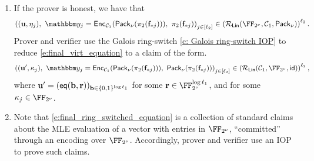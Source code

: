 \documentclass[11pt,letterpaper,usenames,dvipsnames]{article}
\begin{document}
\begin{construction}
\begin{enumerate}[leftmargin=*]
Note that \eqref{e:virtual_IOPP_intermediate} holds if and only if, for all $j\in [\codedim_2]$,
%
\begin{align*}
\eta_j &=\sum_{i\in [\codedim_1']} \vv_i \cdot \pi_2(\bfh_{ij}) = \sum_{i\in [\codedim_1']} \vv_i \cdot \sum_{t\in [\codedim_1]} M_{0it}\cdot \pi_2(\bff_{tj})\\ =& \sum_{t\in [\codedim_1]} \left(\sum_{i\in[\codedim_1']}M_{0it}\cdot \vv_i\right)\cdot \pi_2(\bff_{tj}) = \langle \uu_j , \pi_2(\bff_{*j})\rangle,
\end{align*}
where $\uu \in \comfield^{\codedim_1}$ is the vector whose $t$-th entry is
%
$$
\uu_t = \langle \vv, M_{0*t}\rangle \in \comfield,
$$
and  $M_{0*t}\in \comfield^{\codedim_1'}$ denotes the $t$-th column of $M_0$, for $t\in [\codedim_1]$,
%

%
Note that, if $\Pi_{\mathsf{red}}$ is as in \cref{?}, then $\vv= (\mathsf{eq}(\bb,\rr))_{\bb\in \{0,1\}^{\log \codedim_1'}}$ for some $\rr\in \comfield^{\log \codedim_1'}$, and then 
$
\uu_t = \mle{M_{0*t}}(\rr) \in \comfield. 
$
%

\item If the prover is honest, we have that
%
\begin{equation}\label{e:final_virt_equation}
\left((\uu, \eta_j),\ \oracle_j = \Enc_{\cC_1}(\pack(\pi_2(\bff_{*j}))), \ \pi_2(\bff_{*j})\right)_{j\in [\codedim_2]} \in \left(\LIN( \comfield,\cC_1,\pack)\right)^{\codedim_2}.
\end{equation}
%
Prover and verifier use the Galois ring-switch \cref{c: Galois ring-switch IOP} to reduce  \eqref{e:final_virt_equation} to a claim of the form.
\begin{equation}\label{e:final_ring_switched_equation}
\left((\uu', \kappa_j),\ \oracle_j = \Enc_{\cC_1}(\pack(\pi_2(\bff_{*j}))), \ \pack(\pi_2(\bff_{*j}))\right)_{j\in [\codedim_2]} \in \left(\LIN(\cC_1, \comfield,\mathsf{id})\right)^{\codedim_2},
\end{equation}
where $\mathbf{u}'=(\mathsf{eq}(\mathbf{b},\mathbf{r}))_{\mathbf{b}\in \{0,1\}^{\log \ell_1}}$ for some $\rr\in \comfield^{\log \codedim_1}$, and for some $\kappa_j\in \comfield$.
\item Note that \eqref{e:final_ring_switched_equation} is a collection of standard claims about the MLE evaluation of a vector with entries in $\comfield$, ``committed'' through an encoding over $\comfield$. Accordingly, prover and verifier use an IOP to prove such claims.
%
 \end{enumerate}
%
\end{construction}
\end{document}
